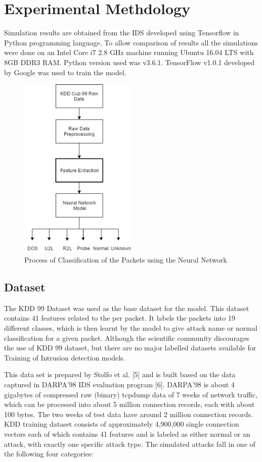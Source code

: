 \documentclass[12pt]{article}
\theoremstyle{definition}
\begin{document}
	
	
	\cleardoublepage
	\section{Experimental Methdology}
	Simulation results are obtained from the IDS developed using Tensorflow in Python programming language. To allow comparison of results all the simulations were done on an Intel Core i7 2.8 GHz machine running Ubuntu 16.04 LTS with 8GB DDR3 RAM. Python version used was v3.6.1. TensorFlow v1.0.1 developed by Google was used to train the model.
	
	\begin{figure}[h]
		\centering
		\includegraphics[height=250pt]{pictures/classification-process.png}
		\caption{Process of Classification of the Packets using the Neural Network}
		\label{fig:classification-flow}
	\end{figure}
	
		\subsection{Dataset}
		The KDD 99 Dataset was used as the base dataset for the model. This dataset contains 41 features related to the per packet. It labels the packets into 19 different classes, which is then learnt by the model to give attack name or normal classification for a given packet. Although the scientific community discourages the use of KDD 99 dataset, but there are no major labelled datasets available for Training of Intrusion detection models.
		
		This data set is prepared by Stolfo et al. [5] and is built
		based on the data captured in DARPA’98 IDS evaluation
		program [6]. DARPA’98 is about 4 gigabytes of compressed
		raw (binary) tcpdump data of 7 weeks of network traffic,
		which can be processed into about 5 million connection
		records, each with about 100 bytes. The two weeks of
		test data have around 2 million connection records. KDD
		training dataset consists of approximately 4,900,000 single
		connection vectors each of which contains 41 features and
		is labeled as either normal or an attack, with exactly one
		specific attack type. The simulated attacks fall in one of the
		following four categories:
		
\end{document}
